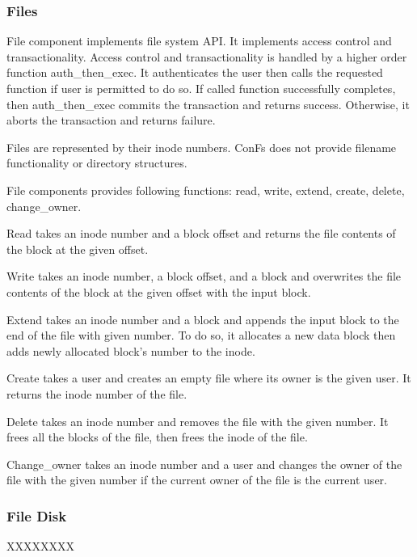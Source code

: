 \subsubsection{Files}
File component implements file system API. It implements access control and transactionality. Access control and transactionality is handled by a higher order function auth\_then\_exec. It authenticates the user then calls the requested function if user is permitted to do so. If called function successfully completes, then auth\_then\_exec commits the transaction and returns success. Otherwise, it aborts the transaction and returns failure.

Files are represented by their inode numbers. ConFs does not provide filename functionality or directory structures.

File components provides following functions: read, write, extend, create, delete, change\_owner.

Read takes an inode number and a block offset and returns the file contents of the block at the given offset.

Write takes an inode number, a block offset, and a block and overwrites the file contents of the block at the given offset with the input block.

Extend takes an inode number and a block and appends the input block to the end of the file with given number. To do so, it allocates a new data block then adds newly allocated block's number to the inode.

Create takes a user and creates an empty file where its owner is the given user. It returns the inode number of the file.

Delete takes an inode number and removes the file with the given number. It frees all the blocks of the file, then frees the inode of the file.

Change\_owner takes an inode number and a user and changes the owner of the file with the given number if the current owner of the file is the current user.

\subsubsection{File Disk}
{\color{red} XXXXXXXX}